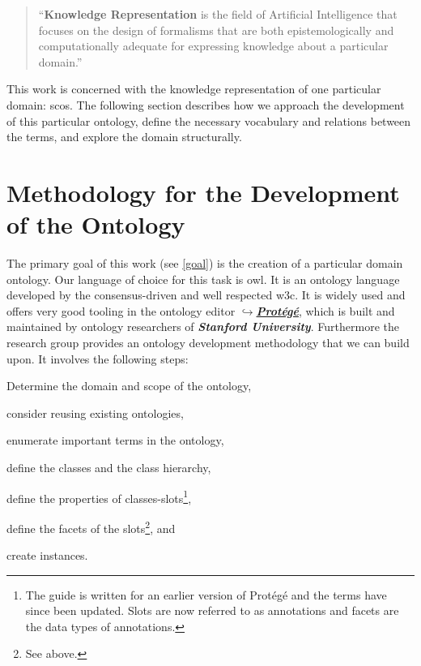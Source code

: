 \documentclass[a4paper, DIV=13, BCOR=0cm]{scrbook}
\newcommand{\pn}[1]{\textit{\textbf{#1}}}
\newcommand{\link}[2]{\href{#1}{$\hookrightarrow$#2}}
\begin{document}
\begin{quote}
	\enquote{\textbf{Knowledge Representation} is the field of Artificial Intelligence that focuses on the design of formalisms that are both epistemologically and computationally adequate for expressing knowledge about a particular domain.} \cite[p.\,XV, Preface]{baader2017introduction}
\end{quote}

This work is concerned with the knowledge representation of one particular domain: \glspl{sco}. The following section describes how we approach the development of this particular ontology, define the necessary vocabulary and relations between the terms, and explore the domain structurally.

\section{Methodology for the Development of the Ontology}
\label{methodology}
The primary goal of this work (see \autoref{goal}) is the creation of a particular domain ontology. Our language of choice for this task is \gls{owl}. It is an ontology language developed by the consensus-driven and well respected \gls{w3c}. \cite[p.\,206]{baader2017introduction} It is widely used and offers very good tooling in the ontology editor \link{https://protege.stanford.edu}{\pn{Protégé}}, which is built and maintained by ontology researchers of \pn{Stanford University}. \cite{musen2015protege} Furthermore the research group provides an ontology development methodology \cite{guide-to-ontology} that we can build upon. It involves the following steps:
\begin{compactenum}[(1)]
	\item Determine the domain and scope of the ontology,
	\item consider reusing existing ontologies,
	\item enumerate important terms in the ontology,
	\item define the classes and the class hierarchy,
	\item define the properties of classes-slots\footnote{The guide is written for an earlier version of Protégé and the terms have since been updated. Slots are now referred to as annotations and facets are the data types of annotations.},
	\item define the facets of the slots\footnote{See above.}, and
	\item create instances.
\end{compactenum}
\end{document}

